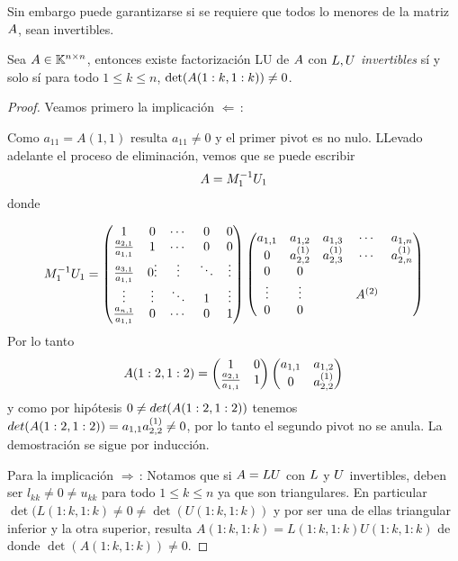Sin embargo puede garantizarse si se requiere que todos lo menores de la matriz $\Ab$,
sean invertibles.

\begin{tcolorbox}
[colback=black!15!white,colframe=black!75!black]
\begin{prop}\label{prop:menorenonulos}
 Sea $\Ab\in \Knn$, entonces existe factorización LU de $\Ab$ con $\Lb,\Ub$ \emph{invertibles} sí y solo sí
 para todo  $1\le k\le n$,  $\det(\Ab(1:k,1:k))\neq 0$.
\end{prop}

\end{tcolorbox}
 \begin{proof} Veamos primero la implicación $\Leftarrow\,$:
 
 
 Como $a_{11}=A(1,1)$ resulta $a_{11}\neq 0$ y el primer pivot es no nulo. LLevado adelante el proceso de eliminación, vemos que se puede escribir
$$
\Ab=\Mb_1^{-1}\Ub_1
$$
donde

$$
\Mb_1^{-1}\Ub_1=
\begin{pmatrix}
1 & 0 & \cdots & 0 & 0\\
\frac{a_{2,1}}{a_{1,1}} & 1 & \cdots & 0 & 0 \\
\frac{a_{3,1}}{a_{1,1}} & 0
\vdots  & \vdots  & \ddots & \vdots  \\
\vdots  & \vdots  & \ddots &1&  \vdots  \\
\frac{a_{n,1}}{a_{1,1}} &  0 & \cdots & 0& 1 
\end{pmatrix}\begin{pmatrix}
a_{1,1}& a_{1,2} & a_{1,3} &\cdots & a_{1,n} \\
0 & a^{(1)}_{2,2} & a^{(1)}_{2,3} &\cdots & a^{(1)}_{2,n} \\
0 & 0 & &  &  \\
\vdots  & \vdots &  & \Ab^{(2)} &   \\
0 & 0&  &  
\end{pmatrix}
$$
Por lo tanto
$$
\Ab(1:2,1:2)=\begin{pmatrix}
1 & 0 \\
\frac{a_{2,1}}{a_{1,1}} & 1\\
\end{pmatrix}\begin{pmatrix}
a_{1,1}& a_{1,2} \\
0 & a^{(1)}_{2,2} 
\end{pmatrix}
$$
y como por hip\'otesis
$0\neq det(\Ab(1:2,1:2))$ tenemos $det(\Ab(1:2,1:2))=a_{1,1}a_{2,2}^{(1)}\neq 0$, por lo tanto el segundo pivot no se anula. La demostración se sigue por inducción.

Para la implicación $\Rightarrow\,$: Notamos que si $\Ab=\Lb\Ub$ con $\Lb$ y $\Ub$ invertibles, deben ser $l_{kk}\neq 0 \neq u_{kk}$ para todo $1\le k \le n$ ya que son triangulares. En particular $\det(L(1:k,1:k)\neq 0 \neq \det(U(1:k,1:k))$ y por ser  una de ellas triangular inferior y la otra superior, resulta $A(1:k,1:k)=L(1:k,1:k)U(1:k,1:k)$ de donde
$\det(A(1:k,1:k))\neq 0$.
 \end{proof}

